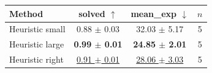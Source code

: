 \begin{tabular}{lccc}
\toprule
Method & solved $\uparrow$ & mean\_exp $\downarrow$ & $n$ \\
\midrule
Heuristic small & 0.88 $\pm$ 0.03 & 32.03 $\pm$ 5.17 & 5 \\
Heuristic large & \textbf{0.99 $\pm$ 0.01} & \textbf{24.85 $\pm$ 2.01} & 5 \\
Heuristic right & \underline{0.91 $\pm$ 0.01} & \underline{28.06 $\pm$ 3.03} & 5 \\
\bottomrule
\end{tabular}
